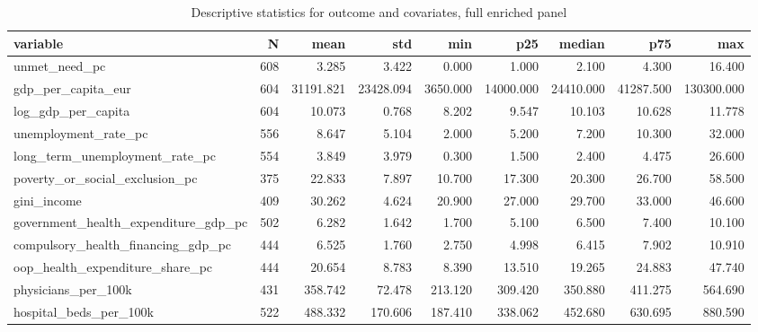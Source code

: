\begin{table}
\caption{Descriptive statistics for outcome and covariates, full enriched panel}
\label{tab:descriptive_statistics}
\begin{tabular}{lrrrrrrrr}
\toprule
variable & N & mean & std & min & p25 & median & p75 & max \\
\midrule
unmet\_need\_pc & 608 & 3.285 & 3.422 & 0.000 & 1.000 & 2.100 & 4.300 & 16.400 \\
gdp\_per\_capita\_eur & 604 & 31191.821 & 23428.094 & 3650.000 & 14000.000 & 24410.000 & 41287.500 & 130300.000 \\
log\_gdp\_per\_capita & 604 & 10.073 & 0.768 & 8.202 & 9.547 & 10.103 & 10.628 & 11.778 \\
unemployment\_rate\_pc & 556 & 8.647 & 5.104 & 2.000 & 5.200 & 7.200 & 10.300 & 32.000 \\
long\_term\_unemployment\_rate\_pc & 554 & 3.849 & 3.979 & 0.300 & 1.500 & 2.400 & 4.475 & 26.600 \\
poverty\_or\_social\_exclusion\_pc & 375 & 22.833 & 7.897 & 10.700 & 17.300 & 20.300 & 26.700 & 58.500 \\
gini\_income & 409 & 30.262 & 4.624 & 20.900 & 27.000 & 29.700 & 33.000 & 46.600 \\
government\_health\_expenditure\_gdp\_pc & 502 & 6.282 & 1.642 & 1.700 & 5.100 & 6.500 & 7.400 & 10.100 \\
compulsory\_health\_financing\_gdp\_pc & 444 & 6.525 & 1.760 & 2.750 & 4.998 & 6.415 & 7.902 & 10.910 \\
oop\_health\_expenditure\_share\_pc & 444 & 20.654 & 8.783 & 8.390 & 13.510 & 19.265 & 24.883 & 47.740 \\
physicians\_per\_100k & 431 & 358.742 & 72.478 & 213.120 & 309.420 & 350.880 & 411.275 & 564.690 \\
hospital\_beds\_per\_100k & 522 & 488.332 & 170.606 & 187.410 & 338.062 & 452.680 & 630.695 & 880.590 \\
\bottomrule
\end{tabular}
\end{table}
